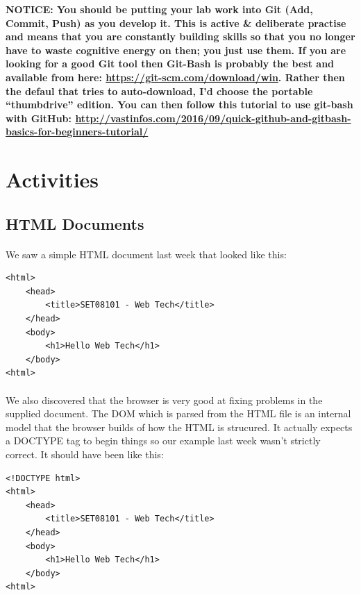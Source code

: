 \documentclass[10pt, a4paper, twosize]{article}
\begin{document}
\begin{framed}
{\bf{NOTICE:} You should be putting your lab work into Git (Add, Commit, Push) as you develop it. This is active \& deliberate practise and means that you are constantly building skills so that you no longer have to waste cognitive energy on then; you just use them. If you are looking for a good Git tool then Git-Bash is probably the best and available from here: \url{https://git-scm.com/download/win}. Rather then the defaul that tries to auto-download, I'd choose the portable ``thumbdrive'' edition. You can then follow this tutorial to use git-bash with GitHub: \url{http://vastinfos.com/2016/09/quick-github-and-gitbash-basics-for-beginners-tutorial/} }
\end{framed}


\section{Activities}

\subsection{HTML Documents}
\paragraph{} We saw a simple HTML document last week that looked like this:

\begin{lstlisting}
<html>
    <head>
        <title>SET08101 - Web Tech</title>
    </head>
    <body>
        <h1>Hello Web Tech</h1>
    </body>
<html>
\end{lstlisting}

\paragraph{} We also discovered that the browser is very good at fixing problems in the supplied document. The DOM which is parsed from the HTML file is an internal model that the browser builds of how the HTML is strucured. It actually expects a DOCTYPE tag to begin things so our example last week wasn't strictly correct. It should have been like this:

\begin{lstlisting}
<!DOCTYPE html>
<html>
    <head>
        <title>SET08101 - Web Tech</title>
    </head>
    <body>
        <h1>Hello Web Tech</h1>
    </body>
<html>
\end{lstlisting}
\end{document}

